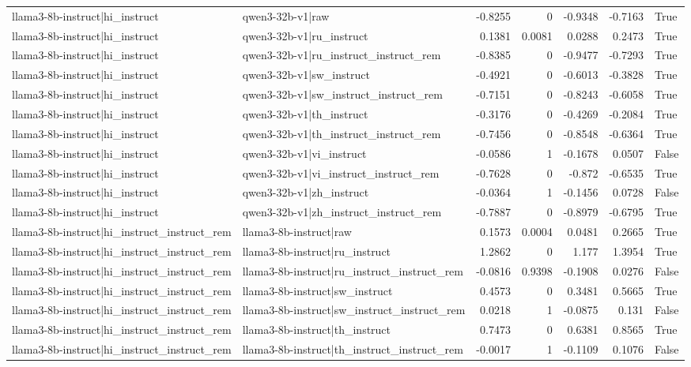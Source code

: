 \begin{table}
\begin{tabular}{l l r r r r l}
llama3-8b-instruct|hi_instruct & qwen3-32b-v1|raw & -0.8255 & 0 & -0.9348 & -0.7163 & True \\
llama3-8b-instruct|hi_instruct & qwen3-32b-v1|ru_instruct & 0.1381 & 0.0081 & 0.0288 & 0.2473 & True \\
llama3-8b-instruct|hi_instruct & qwen3-32b-v1|ru_instruct_instruct_rem & -0.8385 & 0 & -0.9477 & -0.7293 & True \\
llama3-8b-instruct|hi_instruct & qwen3-32b-v1|sw_instruct & -0.4921 & 0 & -0.6013 & -0.3828 & True \\
llama3-8b-instruct|hi_instruct & qwen3-32b-v1|sw_instruct_instruct_rem & -0.7151 & 0 & -0.8243 & -0.6058 & True \\
llama3-8b-instruct|hi_instruct & qwen3-32b-v1|th_instruct & -0.3176 & 0 & -0.4269 & -0.2084 & True \\
llama3-8b-instruct|hi_instruct & qwen3-32b-v1|th_instruct_instruct_rem & -0.7456 & 0 & -0.8548 & -0.6364 & True \\
llama3-8b-instruct|hi_instruct & qwen3-32b-v1|vi_instruct & -0.0586 & 1 & -0.1678 & 0.0507 & False \\
llama3-8b-instruct|hi_instruct & qwen3-32b-v1|vi_instruct_instruct_rem & -0.7628 & 0 & -0.872 & -0.6535 & True \\
llama3-8b-instruct|hi_instruct & qwen3-32b-v1|zh_instruct & -0.0364 & 1 & -0.1456 & 0.0728 & False \\
llama3-8b-instruct|hi_instruct & qwen3-32b-v1|zh_instruct_instruct_rem & -0.7887 & 0 & -0.8979 & -0.6795 & True \\
llama3-8b-instruct|hi_instruct_instruct_rem & llama3-8b-instruct|raw & 0.1573 & 0.0004 & 0.0481 & 0.2665 & True \\
llama3-8b-instruct|hi_instruct_instruct_rem & llama3-8b-instruct|ru_instruct & 1.2862 & 0 & 1.177 & 1.3954 & True \\
llama3-8b-instruct|hi_instruct_instruct_rem & llama3-8b-instruct|ru_instruct_instruct_rem & -0.0816 & 0.9398 & -0.1908 & 0.0276 & False \\
llama3-8b-instruct|hi_instruct_instruct_rem & llama3-8b-instruct|sw_instruct & 0.4573 & 0 & 0.3481 & 0.5665 & True \\
llama3-8b-instruct|hi_instruct_instruct_rem & llama3-8b-instruct|sw_instruct_instruct_rem & 0.0218 & 1 & -0.0875 & 0.131 & False \\
llama3-8b-instruct|hi_instruct_instruct_rem & llama3-8b-instruct|th_instruct & 0.7473 & 0 & 0.6381 & 0.8565 & True \\
llama3-8b-instruct|hi_instruct_instruct_rem & llama3-8b-instruct|th_instruct_instruct_rem & -0.0017 & 1 & -0.1109 & 0.1076 & False \\

\end{tabular}
\end{table}

